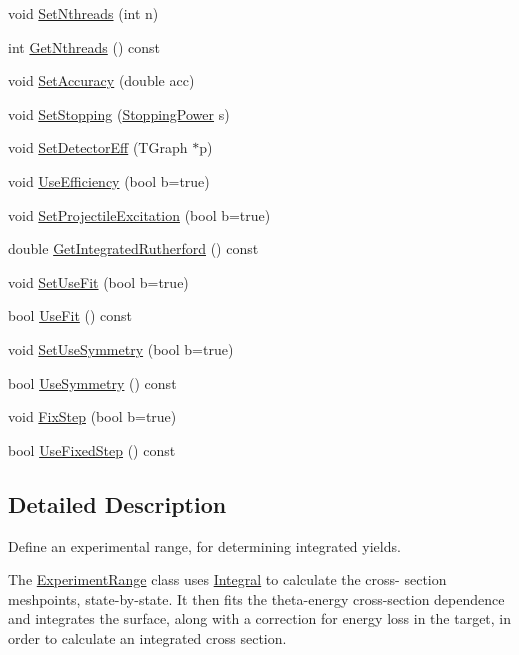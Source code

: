 \begin{DoxyCompactItemize}
void \hyperlink{classExperimentRange_a098eebb45b8e1290e7c23107612392a1}{Set\-Nthreads} (int n)
\item 
int \hyperlink{classExperimentRange_a5a29b5bc1c4d8095899643fdb14ba552}{Get\-Nthreads} () const 
\item 
void \hyperlink{classExperimentRange_a0043948469f3eaa80e4c17783614941c}{Set\-Accuracy} (double acc)
\item 
void \hyperlink{classExperimentRange_a8df587a45ddeaa9855e72da17d660c74}{Set\-Stopping} (\hyperlink{classStoppingPower}{Stopping\-Power} s)
\item 
void \hyperlink{classExperimentRange_a22dab1b20aa39e59f3cd3e78bba506db}{Set\-Detector\-Eff} (T\-Graph $\ast$p)
\item 
void \hyperlink{classExperimentRange_a21457bd02435c4b113f3b5b7c474a5c2}{Use\-Efficiency} (bool b=true)
\item 
void \hyperlink{classExperimentRange_a8e6e4dde1e7316191fe4f3156bb03be3}{Set\-Projectile\-Excitation} (bool b=true)
\item 
double \hyperlink{classExperimentRange_a33b2e3936a2d5933397e82bdcd29d06c}{Get\-Integrated\-Rutherford} () const 
\item 
void \hyperlink{classExperimentRange_a90e7681ee2de091d7011d546922763d1}{Set\-Use\-Fit} (bool b=true)
\item 
bool \hyperlink{classExperimentRange_a3091c15329dd483ad78d1a14370c3111}{Use\-Fit} () const 
\item 
void \hyperlink{classExperimentRange_a21dcba393bf6ebb91c00ed8905216be5}{Set\-Use\-Symmetry} (bool b=true)
\item 
bool \hyperlink{classExperimentRange_addecffed92c4b2f7072c19d1dfcc5cb1}{Use\-Symmetry} () const 
\item 
void \hyperlink{classExperimentRange_a4885e22d841b39492688eae10f101eb2}{Fix\-Step} (bool b=true)
\item 
bool \hyperlink{classExperimentRange_a882a794265e1b146e6e3902626a579fd}{Use\-Fixed\-Step} () const 
\end{DoxyCompactItemize}


\subsection{Detailed Description}
Define an experimental range, for determining integrated yields. 

The \hyperlink{classExperimentRange}{Experiment\-Range} class uses \hyperlink{classIntegral}{Integral} to calculate the cross-\/ section meshpoints, state-\/by-\/state. It then fits the theta-\/energy cross-\/section dependence and integrates the surface, along with a correction for energy loss in the target, in order to calculate an integrated cross section. 

